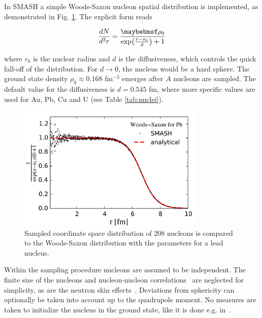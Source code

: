 In SMASH a simple Woods-Saxon nucleon spatial distribution is implemented, as
 demonstrated in Fig. \ref{fig:woods-saxon}. The explicit form reads

\begin{equation} \label{eq:woods_saxon}
  \frac{dN}{d^3r} = \frac{\rho_0}{\expOf{\frac{r-r_0}{d}} + 1}
\end{equation}

where $r_0$ is the nuclear radius and $d$ is the diffusiveness, which controls
the quick fall-off of the distribution. For $d\rightarrow 0$, the nucleus would
be a hard sphere.  The ground state density $\rho_0 \approx 0.168$ fm$^{-3}$
emerges after $A$ nucleons are sampled.  The default value for the
diffusiveness is $d=0.545$ fm, where more specific values are used for Au, Pb,
Cu and  U (see Table \ref{tab:nuclei}).

\begin{figure}
  \centering
  \includegraphics[width=0.8\textwidth]{plots/smash/woods_saxon_nor2.pdf}
  \caption{Sampled coordinate space distribution of 208 nucleons is compared to the
           Woods-Saxon distribution with the parameters for a lead nucleus.}
  \label{fig:woods-saxon}
\end{figure}

Within the sampling procedure nucleons are assumed to be independent.
The finite size of the nucleons and nucleon-nucleon correlations~\cite{Alvioli:2009ab}
are neglected for simplicity, as are the neutron skin effects~\cite{Tarbert:2013jze}.
Deviations from sphericity can optionally be taken into account up to the quadrupole
moment. No measures are taken to initialize the  nucleus in the ground state, like it
is done e.g. in~\cite{Gaitanos:2010fd}.

